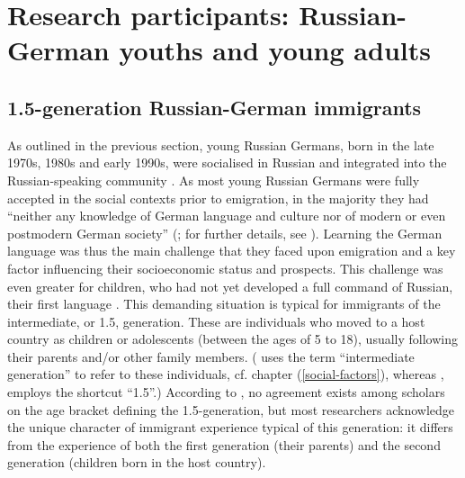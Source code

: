 \section{Research participants: Russian-German youths and young adults}{\label{junge-ru-de}}
\subsection{1.5-generation Russian-German immigrants}
As outlined in the previous section, young Russian Germans, born in the late 1970s, 1980s and early 1990s, were socialised in Russian \citep[cf.][106]{meng01} and integrated into the Russian-speaking community \citep[cf.][275]{roll03}. As most young Russian Germans were fully accepted in the social contexts prior to emigration, in the majority they had ``neither any knowledge of German language and culture nor of modern or even postmodern German society'' (\citealt[272]{roll03}; for further details, see \citealt{dietz-roll198}). Learning the German language was thus the main challenge that they faced upon emigration and a key factor influencing their socioeconomic status and prospects. This challenge was even greater for children, who had not yet developed a full command of Russian, their first language \citep[cf.][106--152]{meng01}. This demanding situation is typical for immigrants of the intermediate, or 1.5, generation.  These are individuals who moved to a host country as children or adolescents (between the ages of 5 to 18), usually following their parents and/or other family members. (\citealt{backus1999,backus06} uses the term “intermediate generation” to refer to these individuals, cf. chapter (\ref{social-factors}), whereas \citealt{remennickTA}, employs the shortcut “1.5”.)  According to \citet{remennickTA}, no agreement exists among scholars on the age bracket defining the 1.5-generation, but most researchers acknowledge the unique character of immigrant experience typical of this generation: it differs from the experience of both the first generation (their parents) and the second generation (children born in the host country). 

